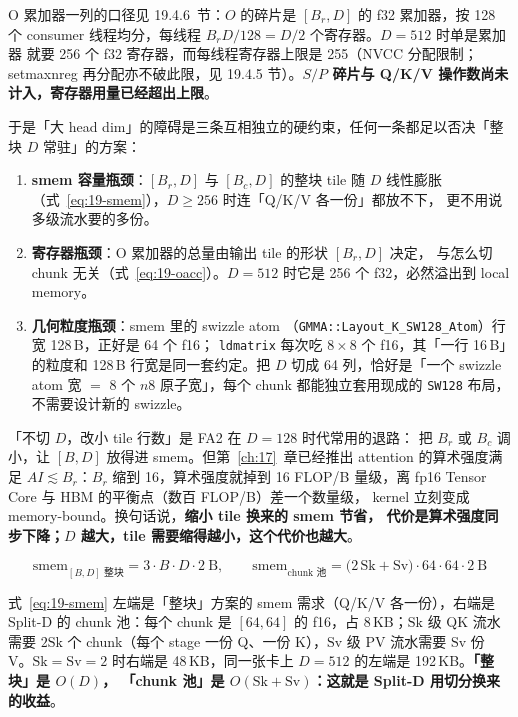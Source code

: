 O 累加器一列的口径见 19.4.6~节：$O$ 的碎片是 $[B_r, D]$ 的 f32 累加器，按 128 个
consumer 线程均分，每线程 $B_r D / 128 = D/2$ 个寄存器。$D = 512$ 时单是累加器
就要 256 个 f32 寄存器，而每线程寄存器上限是 255（NVCC 分配限制；setmaxnreg 再分配亦不破此限，见 19.4.5 节）。\textbf{$S/P$ 碎片与
Q/K/V 操作数尚未计入，寄存器用量已经超出上限}。

于是「大 head dim」的障碍是三条互相独立的硬约束，任何一条都足以否决「整块
$D$ 常驻」的方案：

\begin{enumerate}[itemsep=2pt,topsep=2pt]
  \item \textbf{smem 容量瓶颈}：$[B_r, D]$ 与 $[B_c, D]$ 的整块 tile 随 $D$ 线性膨胀
        （式~\ref{eq:19-smem}），$D \ge 256$ 时连「Q/K/V 各一份」都放不下，
        更不用说多级流水要的多份。
  \item \textbf{寄存器瓶颈}：O 累加器的总量由输出 tile 的形状 $[B_r, D]$ 决定，
        与怎么切 chunk 无关（式~\ref{eq:19-oacc}）。$D = 512$ 时它是 256 个
        f32，必然溢出到 local memory。
  \item \textbf{几何粒度瓶颈}：smem 里的 swizzle atom
        （\texttt{GMMA::\allowbreak{}Layout\_\allowbreak{}K\_\allowbreak{}SW128\_\allowbreak{}Atom}）行宽 128\,B，正好是 64 个 f16；
        \texttt{ldmatrix} 每次吃 $8 \times 8$ 个 f16，其「一行 16\,B」的粒度和
        128\,B 行宽是同一套约定。把 $D$ 切成 64 列，恰好是「一个 swizzle atom
        宽 $=$ 8 个 $n8$ 原子宽」，每个 chunk 都能独立套用现成的
        \texttt{SW128} 布局，不需要设计新的 swizzle。
\end{enumerate}

「不切 $D$，改小 tile 行数」是 FA2 在 $D=128$ 时代常用的退路：
把 $B_r$ 或 $B_c$ 调小，让 $[B, D]$ 放得进 smem。但第~\ref{ch:17}~章已经推出
attention 的算术强度满足 $AI \lesssim B_r$：$B_r$ 缩到 16，算术强度就掉到 16
FLOP/B 量级，离 fp16 Tensor Core 与 HBM 的平衡点（数百 FLOP/B）差一个数量级，
kernel 立刻变成 memory-bound。换句话说，\textbf{缩小 tile 换来的 smem 节省，
代价是算术强度同步下降；$D$ 越大，tile 需要缩得越小，这个代价也越大}。

\begin{equation}
  \mathrm{smem}_{[B,D]\text{ 整块}} = 3 \cdot B \cdot D \cdot 2\ \text{B} ,
  \qquad
  \mathrm{smem}_{\text{chunk 池}} = \bigl(2\,\mathrm{Sk} + \mathrm{Sv}\bigr)\cdot 64 \cdot 64 \cdot 2\ \text{B}
  \label{eq:19-smem}
\end{equation}

式~\ref{eq:19-smem} 左端是「整块」方案的 smem 需求（Q/K/V 各一份），右端是
Split-D 的 chunk 池：每个 chunk 是 $[64,64]$ 的 f16，占 8\,KB；$\mathrm{Sk}$ 级
QK 流水需要 $2\mathrm{Sk}$ 个 chunk（每个 stage 一份 Q、一份 K），$\mathrm{Sv}$
级 PV 流水需要 $\mathrm{Sv}$ 份 V。$\mathrm{Sk}=\mathrm{Sv}=2$ 时右端是
48\,KB，同一张卡上 $D=512$ 的左端是 192\,KB。\textbf{「整块」是 $O(D)$，
「chunk 池」是 $O(\mathrm{Sk} + \mathrm{Sv})$：这就是 Split-D 用切分换来的收益}。

